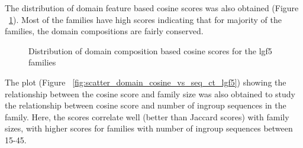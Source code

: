 \documentclass{article}
\begin{document}
		The distribution of domain feature based cosine scores was also obtained (Figure ~\ref{fig:hist_domain_cosine_scores_lgf5}). Most of the families have high scores indicating that for majority of the families, the domain compositions are fairly conserved. 
		
		\begin{figure}
			\caption{Distribution of domain composition based cosine scores for the lgf5 families}
			\label{fig:hist_domain_cosine_scores_lgf5}
		\end{figure}
		
		The plot (Figure ~\ref{fig:scatter_domain_cosine_vs_seq_ct_lgf5}) showing the relationship between the cosine score and family size was also obtained to study the relationship between cosine score and number of ingroup sequences in the family. Here, the scores correlate well (better than Jaccard scores) with family sizes, with higher scores for families with number of ingroup sequences between 15-45.
		
\end{document}
